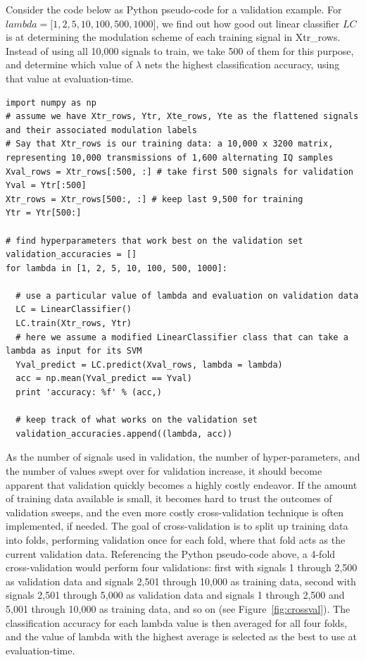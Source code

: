 Consider the code below as Python pseudo-code for a validation example. For $lambda = \lbrack 1,2,5,10,100,500,1000 \rbrack$, we find out how good out linear classifier $LC$ is at determining the modulation scheme of each training signal in Xtr\_rows. Instead of using all 10,000 signals to train, we take 500 of them for this purpose, and determine which value of $\lambda$ nets the highest classification accuracy, using that value at evaluation-time.

\begin{lstlisting}[breaklines]
import numpy as np
# assume we have Xtr_rows, Ytr, Xte_rows, Yte as the flattened signals and their associated modulation labels
# Say that Xtr_rows is our training data: a 10,000 x 3200 matrix, representing 10,000 transmissions of 1,600 alternating IQ samples
Xval_rows = Xtr_rows[:500, :] # take first 500 signals for validation
Yval = Ytr[:500]
Xtr_rows = Xtr_rows[500:, :] # keep last 9,500 for training
Ytr = Ytr[500:]

# find hyperparameters that work best on the validation set
validation_accuracies = []
for lambda in [1, 2, 5, 10, 100, 500, 1000]:
  
  # use a particular value of lambda and evaluation on validation data
  LC = LinearClassifier()
  LC.train(Xtr_rows, Ytr)
  # here we assume a modified LinearClassifier class that can take a lambda as input for its SVM
  Yval_predict = LC.predict(Xval_rows, lambda = lambda)
  acc = np.mean(Yval_predict == Yval)
  print 'accuracy: %f' % (acc,)

  # keep track of what works on the validation set
  validation_accuracies.append((lambda, acc))
\end{lstlisting}

As the number of signals used in validation, the number of hyper-parameters, and the number of values swept over for validation increase, it should become apparent that validation quickly becomes a highly costly endeavor. If the amount of training data available is small, it becomes hard to trust the outcomes of validation sweeps, and the even more costly cross-validation technique is often implemented, if needed. The goal of cross-validation is to split up training data into folds, performing validation once for each fold, where that fold acts as the current validation data. Referencing the Python pseudo-code above, a 4-fold cross-validation would perform four validations: first with signals 1 through 2,500 as validation data and signals 2,501 through 10,000 as training data, second with signals 2,501 through 5,000 as validation data and signals 1 through 2,500 and 5,001 through 10,000 as training data, and so on (see Figure~\ref{fig:crossval}). The classification accuracy for each lambda value is then averaged for all four folds, and the value of lambda with the highest average is selected as the best to use at evaluation-time.

